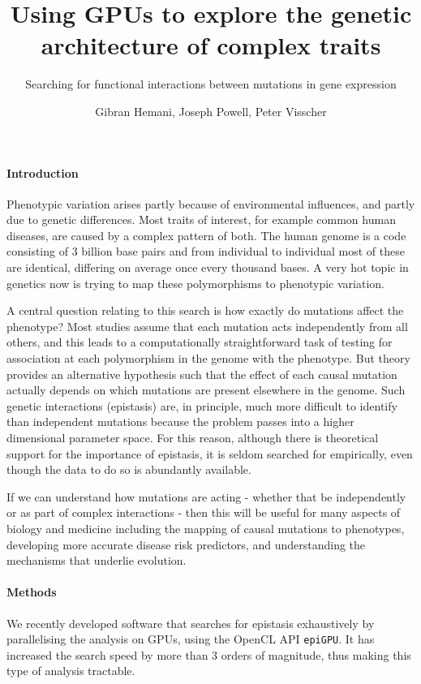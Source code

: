 \documentclass{scrartcl}
\title{Using GPUs to explore the genetic architecture of complex traits}
\subtitle{Searching for functional interactions between mutations in gene expression}
\author{Gibran Hemani, Joseph Powell, Peter Visscher}
\date{}
\begin{document}
\maketitle

\paragraph{Introduction}

Phenotypic variation arises partly because of environmental influences, and partly due to genetic differences. Most traits of interest, for example common human diseases, are caused by a complex pattern of both. The human genome is a code consisting of 3 billion base pairs and from individual to individual most of these are identical, differing on average once every thousand bases. A very hot topic in genetics now is trying to map these polymorphisms to phenotypic variation.

A central question relating to this search is how exactly do mutations affect the phenotype? Most studies assume that each mutation acts independently from all others, and this leads to a computationally straightforward task of testing for association at each polymorphism in the genome with the phenotype. But theory provides an alternative hypothesis such that the effect of each causal mutation actually depends on which mutations are present elsewhere in the genome. Such genetic interactions (epistasis) are, in principle, much more difficult to identify than independent mutations because the problem passes into a higher dimensional parameter space. For this reason, although there is theoretical support for the importance of epistasis, it is seldom searched for empirically, even though the data to do so is abundantly available.

If we can understand how mutations are acting - whether that be independently or as part of complex interactions - then this will be useful for many aspects of biology and medicine including the mapping of causal mutations to phenotypes, developing more accurate disease risk predictors, and understanding the mechanisms that underlie evolution. 

\paragraph{Methods}

We recently developed software that searches for epistasis exhaustively by parallelising the analysis on GPUs, using the OpenCL API {\tt epiGPU}. It has increased the search speed by more than 3 orders of magnitude, thus making this type of analysis tractable.
\end{document}
